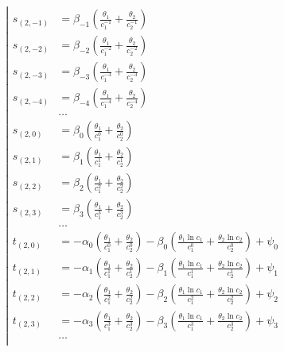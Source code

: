 \begin{equation*} \left| \begin{aligned}
s_{(2,-1)} &=
  \beta_{-1} \left(
  \frac{\theta_1}{c_1^{-1}}
+ \frac{\theta_2}{c_2^{-1}} \right) \\
%
s_{(2,-2)} &=
  \beta_{-2} \left(
  \frac{\theta_1}{c_1^{-2}}
+ \frac{\theta_2}{c_2^{-2}} \right) \\
%
s_{(2,-3)} &=
  \beta_{-3} \left(
  \frac{\theta_1}{c_1^{-3}}
+ \frac{\theta_2}{c_2^{-3}} \right) \\
%
s_{(2,-4)} &=
  \beta_{-4} \left(
  \frac{\theta_1}{c_1^{-4}}
+ \frac{\theta_2}{c_2^{-4}} \right) \\
%
&\ldots \\
%
s_{(2,0)} &=
  \beta_0 \left(
  \frac{\theta_1}{c_1^0}
+ \frac{\theta_2}{c_2^0} \right) \\
%
s_{(2,1)} &=
  \beta_1 \left(
  \frac{\theta_1}{c_1^1}
+ \frac{\theta_2}{c_2^1} \right) \\
%
s_{(2,2)} &=
  \beta_2 \left(
  \frac{\theta_1}{c_1^2}
+ \frac{\theta_2}{c_2^2} \right) \\
%
s_{(2,3)} &=
  \beta_3 \left(
  \frac{\theta_1}{c_1^3}
+ \frac{\theta_2}{c_2^3} \right) \\
%
&\ldots \\
%
t_{(2,0)} &=
- \alpha_0 \left(
  \frac{\theta_1}{c_1^0}
+ \frac{\theta_2}{c_2^0} \right)
- \beta_0 \left(
  \frac{\theta_1 \ln{c_1}}{c_1^0}
+ \frac{\theta_2 \ln{c_2}}{c_2^0} \right)
+ \psi_0 \\
%
t_{(2,1)} &=
- \alpha_1 \left(
  \frac{\theta_1}{c_1^1}
+ \frac{\theta_2}{c_2^1} \right)
- \beta_1 \left(
  \frac{\theta_1 \ln{c_1}}{c_1^1}
+ \frac{\theta_2 \ln{c_2}}{c_2^1} \right)
+ \psi_1 \\
%
t_{(2,2)} &=
- \alpha_2 \left(
  \frac{\theta_1}{c_1^2}
+ \frac{\theta_2}{c_2^2} \right)
- \beta_2 \left(
  \frac{\theta_1 \ln{c_1}}{c_1^2}
+ \frac{\theta_2 \ln{c_2}}{c_2^2} \right)
+ \psi_2 \\
%
t_{(2,3)} &=
- \alpha_3 \left(
  \frac{\theta_1}{c_1^3}
+ \frac{\theta_2}{c_2^3} \right)
- \beta_3 \left(
  \frac{\theta_1 \ln{c_1}}{c_1^3}
+ \frac{\theta_2 \ln{c_2}}{c_2^3} \right)
+ \psi_3 \\
%
&\ldots \\
\end{aligned} \right. \end{equation*}
%
